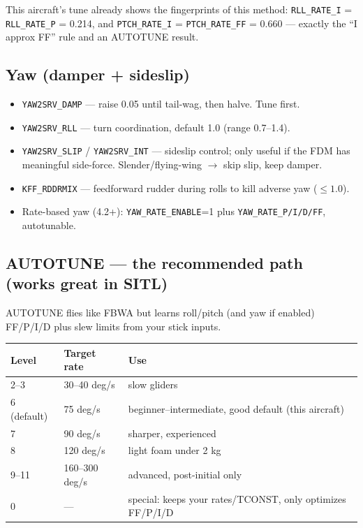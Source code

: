 \documentclass[11pt,a4paper]{article}
\newcommand{\pp}[1]{\texttt{#1}} %
\begin{document}
This aircraft's tune already shows the fingerprints of this method:
\pp{RLL\_RATE\_I} = \pp{RLL\_RATE\_P} = 0.214, and \pp{PTCH\_RATE\_I} =
\pp{PTCH\_RATE\_FF} = 0.660 --- exactly the ``I approx FF'' rule and an AUTOTUNE
result.

\subsection{Yaw (damper + sideslip)}
\begin{itemize}[leftmargin=1.4em]
  \item \pp{YAW2SRV\_DAMP} --- raise 0.05 until tail-wag, then halve. Tune first.
  \item \pp{YAW2SRV\_RLL} --- turn coordination, default 1.0 (range 0.7--1.4).
  \item \pp{YAW2SRV\_SLIP} / \pp{YAW2SRV\_INT} --- sideslip control; only useful if
  the FDM has meaningful side-force. Slender/flying-wing $\rightarrow$ skip slip,
  keep damper.
  \item \pp{KFF\_RDDRMIX} --- feedforward rudder during rolls to kill adverse yaw
  ($\leq 1.0$).
  \item Rate-based yaw (4.2+): \pp{YAW\_RATE\_ENABLE}=1 plus \pp{YAW\_RATE\_P/I/D/FF},
  autotunable.
\end{itemize}

\subsection{AUTOTUNE --- the recommended path (works great in SITL)}

AUTOTUNE flies like FBWA but learns roll/pitch (and yaw if enabled) FF/P/I/D plus
slew limits from your stick inputs.

\begin{longtable}{@{}p{1.6cm}p{2.6cm}p{10.5cm}@{}}
\toprule
\textbf{Level} & \textbf{Target rate} & \textbf{Use}\\
\midrule
\endhead
2--3 & 30--40 deg/s & slow gliders\\
6 (default) & 75 deg/s & beginner--intermediate, good default (this aircraft)\\
7 & 90 deg/s & sharper, experienced\\
8 & 120 deg/s & light foam under 2 kg\\
9--11 & 160--300 deg/s & advanced, post-initial only\\
0 & --- & special: keeps your rates/TCONST, only optimizes FF/P/I/D\\
\bottomrule
\end{longtable}
\end{document}

